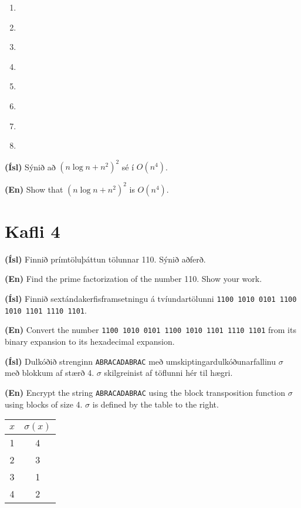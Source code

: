 \documentclass[addpoints]{exam}
\begin{document}
\begin{questions}
\begin{enumerate}
    \item \underline{\hspace{5cm}}
    \item \underline{\hspace{5cm}}
    \item \underline{\hspace{5cm}}
    \item \underline{\hspace{5cm}}
    \item \underline{\hspace{5cm}}
    \item \underline{\hspace{5cm}}
    \item \underline{\hspace{5cm}}
    \item \underline{\hspace{5cm}} 
\end{enumerate}

\question[10]
\textbf{(Ísl)} Sýnið að $(n \log n + n^2)^2$ sé í $O(n^4)$.

\textbf{(En)} Show that $(n \log n + n^2)^2$ is $O(n^4)$.

\section{Kafli 4}
\question[5]
\textbf{(Ísl)} Finnið prímtöluþáttun tölunnar 110. Sýnið aðferð.

\textbf{(En)} Find the prime factorization of the number 110. Show your work.

\question[5]
\textbf{(Ísl)} Finnið sextándakerfisframsetningu á tvíundartölunni \texttt{1100 1010 0101 1100 1010 1101 1110 1101}.

\textbf{(En)} Convert the number \texttt{1100 1010 0101 1100 1010 1101 1110 1101} from its binary expansion to its hexadecimal expansion.

\question[5]
\begin{multicols}{2}

\textbf{(Ísl)} Dulkóðið strenginn \texttt{ABRACADABRAC} með umskiptingardulkóðunarfallinu $\sigma$ með blokkum af stærð 4. $\sigma$ skilgreinist af töflunni hér til hægri.

\textbf{(En)} Encrypt the string \texttt{ABRACADABRAC} using the block transposition function $\sigma$ using blocks of size 4. $\sigma$ is defined by the table to the right.

\vspace{1cm}
\begin{center}
\begin{tabular}{cc}
\toprule
$x$&$\sigma(x)$\\
\midrule
1&4\\
2&3\\
3&1\\
4&2\\
\bottomrule
\end{tabular}
\end{center}


\end{multicols}
\end{questions}
\end{document}
